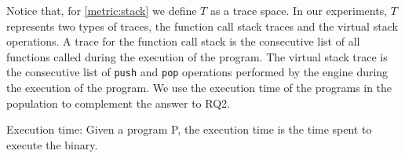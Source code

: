 Notice that, for \autoref{metric:stack} we define $T$ as a trace space. In our experiments, $T$ represents two types of traces, the function call stack traces and the virtual stack operations. A trace for the function call stack is the consecutive list of all functions called during the execution of the \wasm program. The virtual stack trace is the consecutive list of \texttt{push} and \texttt{pop} operations performed by the \wasm engine during the execution of the program.
We use the execution time of the programs in the population to complement the answer to RQ2.

\begin{metric}{Execution time:}\label{metric:time}
	Given a \wasm program P, the execution time is the time spent to execute the binary.
\end{metric}


